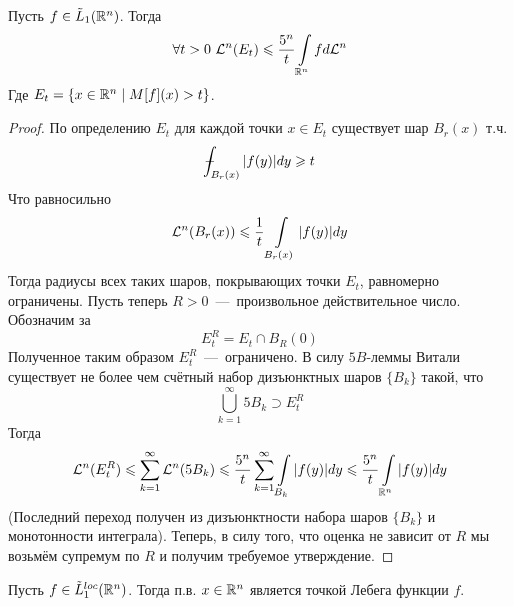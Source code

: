 \begin{lemma}
    Пусть $f \in \Tilde{L}_1(\mathbb{R}^n)$. Тогда \[\forall t > 0 \ 
 \LL^n(E_t) \leq \dfrac{5^n}{t}\int\limits_{\R^n}fd\LL^n\]
 Где $E_t = \{x \in \mathbb{R}^n \mid M[f](x) > t\}$.
\end{lemma}
\begin{proof}
    По определению $E_t$ для каждой точки $x \in E_t$ существует шар $B_r(x)$ т.ч. \[\dashint_{B_r(x)}|f(y)|dy \geq t\]
    Что равносильно \[\mathcal{L}^n(B_r(x)) \leqslant \dfrac{1}{t}\int\limits_{B_r(x)}|f(y)|dy\]
    Тогда радиусы всех таких шаров, покрывающих точки $E_t$, равномерно ограничены. Пусть теперь $R > 0$~---~произвольное действительное число. Обозначим за \[E_t^R = E_t \cap B_R(0)\]
    Полученное таким образом $E_t^R$~---~ограничено. В силу $5B$-леммы Витали существует не более чем счётный набор дизъюнктных шаров $\{B_k\}$ такой, что \[\bigcup\limits_{k = 1}^\infty 5B_k \supset E_t^R\]
    Тогда \[\mathcal{L}^n(E_t^R) \leqslant \sum\limits_{k = 1}^\infty \mathcal{L}^n(5B_k) \leqslant \dfrac{5^n}{t}\sum\limits_{k = 1}^\infty \int\limits_{B_k}|f(y)|dy \leqslant \dfrac{5^n}{t}\int\limits_{\mathbb{R}^n}|f(y)|dy\]
    (Последний переход получен из дизъюнктности набора шаров $\{B_k\}$ и монотонности интеграла). Теперь, в силу того, что оценка не зависит от $R$ мы возьмём супремум по $R$ и получим требуемое утверждение.
\end{proof}
\begin{theorem}
    Пусть $f \in \Tilde{L}_1^{loc}(\mathbb{R}^n)$. Тогда п.в. $x \in \mathbb{R}^n$ является точкой Лебега функции $f$.
\end{theorem}
